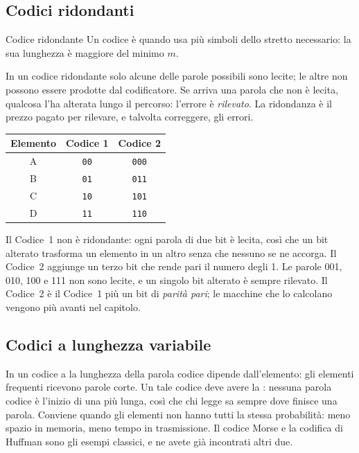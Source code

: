 \subsection{Codici ridondanti}

\begin{definition}{Codice ridondante}
Un codice è  quando usa più simboli dello stretto necessario:
la sua lunghezza è maggiore del minimo $m$.
\end{definition}

In un codice ridondante solo alcune delle parole possibili sono lecite; le
altre non possono essere prodotte dal codificatore. Se arriva una parola che
non è lecita, qualcosa l'ha alterata lungo il percorso: l'errore è
\emph{rilevato}. La ridondanza è il prezzo pagato per rilevare, e talvolta
correggere, gli errori.

\begin{center}\small
\begin{tabular}{@{}ccc@{}}
\toprule
\textbf{Elemento} & \textbf{Codice 1} & \textbf{Codice 2}\\
\midrule
A & \texttt{00} & \texttt{000}\\
B & \texttt{01} & \texttt{011}\\
C & \texttt{10} & \texttt{101}\\
D & \texttt{11} & \texttt{110}\\
\bottomrule
\end{tabular}
\end{center}

Il Codice~1 non è ridondante: ogni parola di due bit è lecita, così che un bit
alterato trasforma un elemento in un altro senza che nessuno se ne accorga. Il
Codice~2 aggiunge un terzo bit che rende pari il numero degli 1. Le parole 001,
010, 100 e 111 non sono lecite, e un singolo bit alterato è sempre rilevato. Il
Codice~2 è il Codice~1 più un bit di \emph{parità pari}; le macchine che lo
calcolano vengono più avanti nel capitolo.

\subsection{Codici a lunghezza variabile}

In un codice a  la lunghezza della parola codice
dipende dall'elemento: gli elementi frequenti ricevono parole corte. Un tale
codice deve avere la : nessuna parola codice è
l'inizio di una più lunga, così che chi legge sa sempre dove finisce una
parola. Conviene quando gli elementi non hanno tutti la stessa probabilità:
meno spazio in memoria, meno tempo in trasmissione. Il codice Morse e la
codifica di Huffman sono gli esempi classici, e ne avete già incontrati altri
due.

